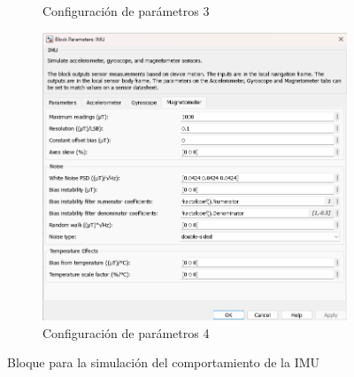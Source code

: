 \begin{figure}[htbp]
\begin{subfigure}[b]{0.45\textwidth}
        \caption{Configuración de parámetros 3}
        \label{fig:parametros_IMU_03}
    \end{subfigure}
    \hfill
    \begin{subfigure}[b]{0.45\textwidth}
        \centering
        \includegraphics[width=\textwidth]{fig/Capitulo5/Caso_de_estudio_IMU/Generador_de_archivos/configuracion_parametros_IMU_04.png}
        \caption{Configuración de parámetros 4}
        \label{fig:parametros_IMU_04}
    \end{subfigure}

    \caption{Bloque para la simulación del comportamiento de la IMU}
    \label{fig:arreglo_imu}
\end{figure}


